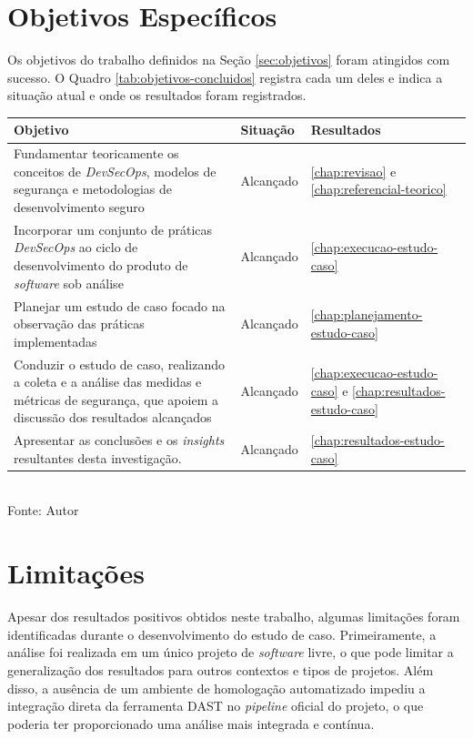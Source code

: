 \section{Objetivos Específicos}

Os objetivos do trabalho definidos na Seção \ref{sec:objetivos} foram atingidos com sucesso. O Quadro \ref{tab:objetivos-concluidos} registra cada um deles e indica a situação atual e onde os resultados foram registrados.

\begin{quadro}[h]
    \centering
    \caption{Objetivos Concluídos}
    \begin{tabular}{|p{9cm}|p{2cm}|p{2.2cm}|}
        \hline
        \textbf{Objetivo} & \textbf{Situação} & \textbf{Resultados} \\
        \hline
        Fundamentar teoricamente os conceitos de \textit{DevSecOps}, modelos de segurança e metodologias de desenvolvimento seguro & Alcançado & \ref{chap:revisao} e \ref{chap:referencial-teorico} \\
        \hline
        Incorporar um conjunto de práticas \textit{DevSecOps} ao ciclo de desenvolvimento do produto de \textit{software} sob análise & Alcançado & \ref{chap:execucao-estudo-caso} \\
        \hline
        Planejar um estudo de caso focado na observação das práticas implementadas & Alcançado & \ref{chap:planejamento-estudo-caso} \\
        \hline
        Conduzir o estudo de caso, realizando a coleta e a análise das medidas e métricas de segurança, que apoiem a discussão dos resultados alcançados & Alcançado & \ref{chap:execucao-estudo-caso} e \ref{chap:resultados-estudo-caso} \\
        \hline
        Apresentar as conclusões e os \textit{insights} resultantes desta investigação. & Alcançado & \ref{chap:resultados-estudo-caso} \\
        \hline
    \end{tabular} \\[0.5em]
    Fonte: Autor
    \label{tab:objetivos-concluidos}
\end{quadro}

\section{Limitações}

Apesar dos resultados positivos obtidos neste trabalho, algumas limitações foram identificadas durante o desenvolvimento do estudo de caso. Primeiramente, a análise foi realizada em um único projeto de \textit{software} livre, o que pode limitar a generalização dos resultados para outros contextos e tipos de projetos. Além disso, a ausência de um ambiente de homologação automatizado impediu a integração direta da ferramenta DAST no \textit{pipeline} oficial do projeto, o que poderia ter proporcionado uma análise mais integrada e contínua.

